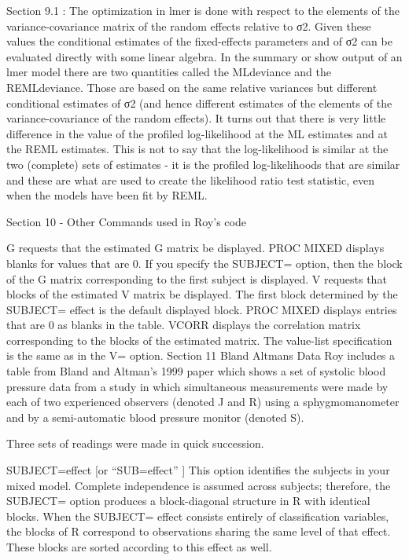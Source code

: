 Section 9.1 : The optimization in lmer is done with respect to the elements of the variance-covariance matrix of the random effects relative to σ2. Given these values the conditional estimates of the fixed-effects parameters and of σ2 can be evaluated directly with some linear algebra. In the summary or show output of an lmer model there are two quantities called the MLdeviance and the REMLdeviance. 
Those are based on the same relative variances but different conditional estimates of σ2 (and hence different estimates of the elements of the variance-covariance of the random effects). It turns out that there is very little difference in the value of the profiled log-likelihood at the ML estimates and at the REML estimates. 
This is not to say that the log-likelihood is similar at the two (complete) sets of estimates - it is the profiled log-likelihoods that are similar and these are what are used to create the likelihood ratio test statistic, even when the models have been fit by REML.

Section 10 - Other Commands used in Roy’s code

G requests that the estimated G matrix be displayed. PROC MIXED displays blanks for values that are 0. 
If you specify the SUBJECT= option, then the block of the  G matrix corresponding to the first subject is displayed. 
V requests that blocks of the estimated V matrix be displayed. The first block determined by the SUBJECT= effect is the default displayed block. PROC MIXED displays entries that are 0 as blanks in the table. 
VCORR displays the correlation matrix corresponding to the blocks of the estimated  matrix. 
The value-list specification is the same as in the V= option. 
Section 11 Bland Altmans Data
Roy includes a table from Bland and Altman’s 1999 paper which shows a set of systolic blood pressure data from a study in which simultaneous measurements were made by each of two experienced observers (denoted J and R) using a sphygmomanometer and by a semi-automatic blood pressure monitor (denoted S).

Three sets of readings were made in quick succession.



SUBJECT=effect 	[or “SUB=effect” ]
This option identifies the subjects in your mixed model. 
Complete independence is assumed across subjects; therefore, the SUBJECT= option produces a block-diagonal structure in R with identical blocks. 
When the SUBJECT= effect consists entirely of classification variables, the blocks of  R correspond to observations sharing the same level of that effect. 
These blocks are sorted according to this effect as well. 






